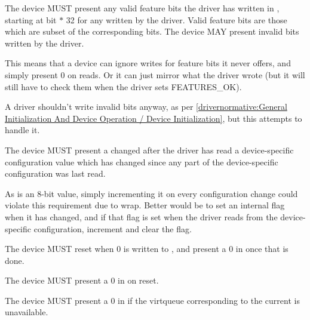 The device MUST present any valid feature bits the driver has written in , starting at bit  $*$ 32 for any  written by the driver.  Valid feature bits are those which are subset of the corresponding  bits.  The device MAY present invalid bits written by the driver.

\begin{note}
  This means that a device can ignore writes for feature bits it never
  offers, and simply present 0 on reads.  Or it can just mirror what the driver wrote
  (but it will still have to check them when the driver sets FEATURES_OK).
\end{note}

\begin{note}
  A driver shouldn't write invalid bits anyway, as per \ref{drivernormative:General Initialization And Device Operation / Device Initialization}, but this attempts to handle it.
\end{note}

The device MUST present a changed  after the
driver has read a device-specific configuration value which has
changed since any part of the device-specific configuration was last
read.
\begin{note}
As  is an 8-bit value, simply incrementing it
on every configuration change could violate this requirement due to wrap.
Better would be to set an internal flag when it has changed,
and if that flag is set when the driver reads from the device-specific
configuration, increment  and clear the flag.
\end{note}

The device MUST reset when 0 is written to , and
present a 0 in  once that is done.

The device MUST present a 0 in  on reset.

The device MUST present a 0 in  if the virtqueue
corresponding to the current  is unavailable.


